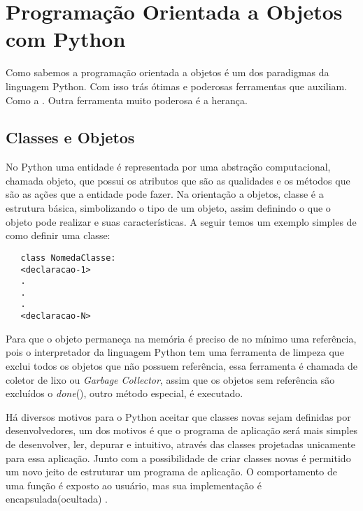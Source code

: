 

\chapter{ Programação Orientada a Objetos com Python}

	 Como sabemos a programação orientada a objetos é um dos paradigmas da linguagem Python. Com isso trás ótimas e poderosas ferramentas que auxiliam. Como a . Outra ferramenta muito poderosa é a herança. 

    \section{Classes e Objetos}
    
	 No Python uma entidade é representada por uma abstração computacional, chamada objeto, que possui os atributos que são as qualidades e os métodos que são as ações que a entidade pode fazer. Na orientação a objetos, classe é a estrutura básica, simbolizando o tipo de um objeto, assim definindo o que o objeto pode realizar e suas características. A seguir temos um exemplo simples de como definir uma classe:
	 \begin{lstlisting}
   class NomedaClasse:
   <declaracao-1>
   .
   .
   .
   <declaracao-N>
	 \end{lstlisting}
	  
	 Para que o objeto permaneça na memória é preciso de no mínimo uma referência, pois o interpretador da linguagem Python tem uma ferramenta de limpeza que exclui todos os objetos que não possuem referência, essa ferramenta é chamada de coletor de lixo ou \textit{Garbage Collector}, assim que os objetos sem referência são excluídos o \textunderscore\textunderscore \textit{done}\textunderscore\textunderscore(), outro método especial, é executado.
	 
	Há diversos motivos para o Python aceitar que classes novas sejam definidas por desenvolvedores, um dos motivos é que o programa de aplicação será mais simples de desenvolver, ler, depurar e intuitivo, através das classes projetadas unicamente para essa aplicação. Junto com a possibilidade de criar classes novas é permitido um novo jeito de estruturar um programa de aplicação. O comportamento de uma função é exposto ao usuário, mas sua implementação é encapsulada(ocultada) \cite{Borges2014}. 
	
